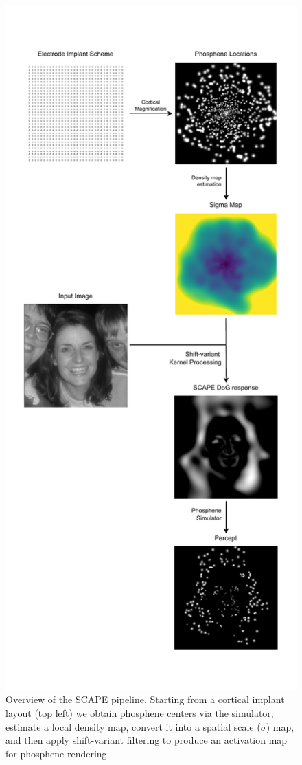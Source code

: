 \begin{figure}[ht]
  \centering
  \includegraphics[width=0.9\linewidth]{figures/SCAPE.drawio.pdf}
  \caption{Overview of the SCAPE pipeline. Starting from a cortical implant layout (top left) we obtain phosphene centers via the simulator, estimate a local density map, convert it into a spatial scale ($\sigma$) map, and then apply shift-variant filtering to produce an activation map for phosphene rendering.}
  \label{fig:scape_pipeline}
\end{figure}

